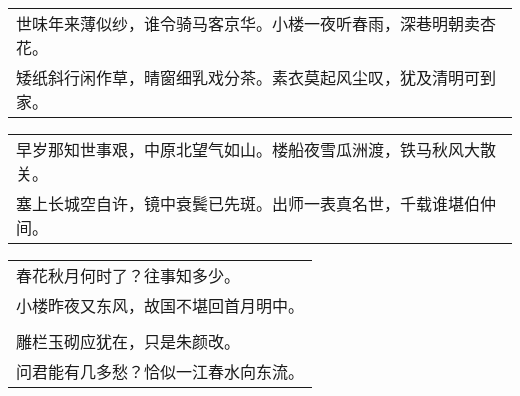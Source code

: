 \noindent\begin{minipage}{\linewidth}
  \vskip-3pt\begin{table}[H]
    \centering
    \begin{tabular}{@{}l@{}}
世味年来薄似纱，谁令骑马客京华。小楼一夜听春雨，深巷明朝卖杏花。\\
矮纸斜行闲作草，晴窗细乳戏分茶。素衣莫起风尘叹，犹及清明可到家。
    \end{tabular}
  \end{table}
\end{minipage}
\vspace{1cm}


\noindent\begin{minipage}{\linewidth}
  \vskip-3pt\begin{table}[H]
    \centering
    \begin{tabular}{@{}l@{}}
早岁那知世事艰，中原北望气如山。楼船夜雪瓜洲渡，铁马秋风大散关。\\
塞上长城空自许，镜中衰鬓已先斑。出师一表真名世，千载谁堪伯仲间。
    \end{tabular}
  \end{table}
\end{minipage}
\vspace{1cm}


\noindent\begin{minipage}{\linewidth}
  \vskip-3pt\begin{table}[H]
    \centering
    \begin{tabular}{@{}l@{}}
春花秋月何时了？往事知多少。\\
小楼昨夜又东风，故国不堪回首月明中。\\
\\
雕栏玉砌应犹在，只是朱颜改。\\
问君能有几多愁？恰似一江春水向东流。
    \end{tabular}
  \end{table}
\end{minipage}
\vspace{1cm}


